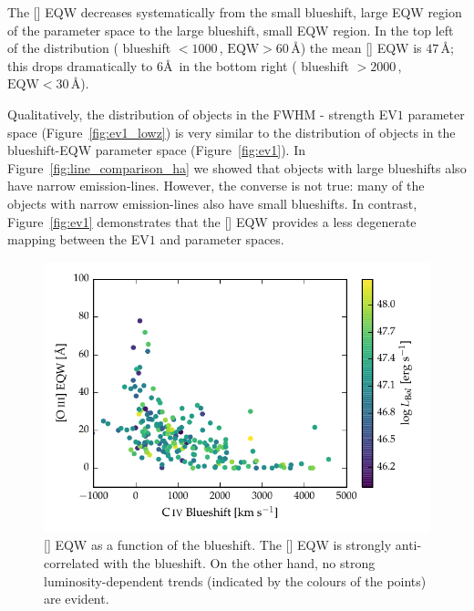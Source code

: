 The [] EQW decreases systematically from the small  blueshift, large EQW region of the parameter space to the large  blueshift, small EQW region.
In the top left of the distribution ( blueshift $<1000$\,\kms, $\text{EQW} > 60$\,\AA) the mean [] EQW is $47$\,\AA; this drops dramatically to $6$\AA\, in the bottom right ( blueshift $>2000$\,\kms, $\text{EQW} < 30$\,\AA).

Qualitatively, the distribution of objects in the \hb FWHM -  strength EV$1$ parameter space (Figure~\ref{fig:ev1_lowz}) is very similar to the distribution of objects in the  blueshift-EQW parameter space (Figure~\ref{fig:ev1}).
In Figure~\ref{fig:line_comparison_ha} we showed that objects with large  blueshifts also have narrow \ha emission-lines.
However, the converse is not true: many of the objects with narrow \ha emission-lines also have small  blueshifts.
In contrast, Figure~\ref{fig:ev1} demonstrates that the [] EQW provides a less degenerate mapping between the EV$1$ and  parameter spaces.

\begin{figure}
    \centering
    \includegraphics[width=\columnwidth]{figures/chapter04/civ_blueshift_oiii_eqw.pdf}
    \caption[{[] EQW as a function of the  blueshift.}]{[] EQW as a function of the  blueshift. The [] EQW is strongly anti-correlated with the  blueshift. On the other hand, no strong luminosity-dependent trends (indicated by the colours of the points) are evident.}
    \label{fig:civ_blueshift_oiii_eqw}
\end{figure}

